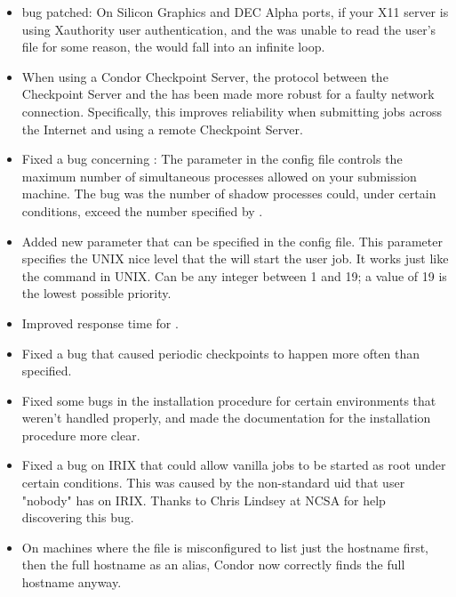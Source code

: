 \begin{itemize}

\item {} bug patched: On Silicon Graphics and DEC Alpha
ports, if your X11 server is using Xauthority user authentication, and
the  was unable to read the user's 
file for some reason, the  would fall into an infinite 
loop.

\item When using a Condor Checkpoint Server, the protocol between the
Checkpoint Server and the  has been made more robust
for a faulty network connection. Specifically, this improves
reliability when submitting jobs across the Internet and using a
remote Checkpoint Server.

\item Fixed a bug concerning : The parameter
 in the config file controls the maximum
number of simultaneous  processes allowed on your
submission machine.
The bug was the number of shadow processes could, under certain
conditions, exceed the number specified by
. 

\item Added new parameter  that can be
specified in the config file.
This parameter specifies the UNIX nice level that the 
will start the user job.
It works just like the  command in UNIX. 
Can be any integer between 1 and 19; a value of 19 is the lowest
possible priority.

\item Improved response time for .

\item Fixed a bug that caused periodic checkpoints to happen more
often than specified.

\item Fixed some bugs in the installation procedure for certain
environments that weren't handled properly, and made the documentation
for the installation procedure more clear.

\item Fixed a bug on IRIX that could allow vanilla jobs to be started
as root under certain conditions.
This was caused by the non-standard uid that user "nobody" has on
IRIX.
Thanks to Chris Lindsey at NCSA for help discovering this bug.

\item On machines where the  file is misconfigured to
list just the hostname first, then the full hostname as an alias,
Condor now correctly finds the full hostname anyway.


\end{itemize}
